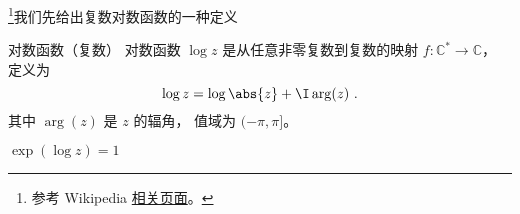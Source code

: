 

\footnote{参考 Wikipedia \href{https://en.wikipedia.org/wiki/Complex_logarithm}{相关页面}。}我们先给出复数对数函数的一种定义
\begin{definition}{对数函数（复数）}
对数函数 $\log z$ 是从任意非零复数到复数的映射 $f:\mathbb C^*\to \mathbb C$， 定义为
\begin{equation}
\log z = \log\abs{z} + \I \arg(z)~.
\end{equation}
其中 $\arg(z)$ 是 $z$ 的辐角， 值域为 $(-\pi, \pi]$。
\end{definition}


$\exp(\log z) = 1$
